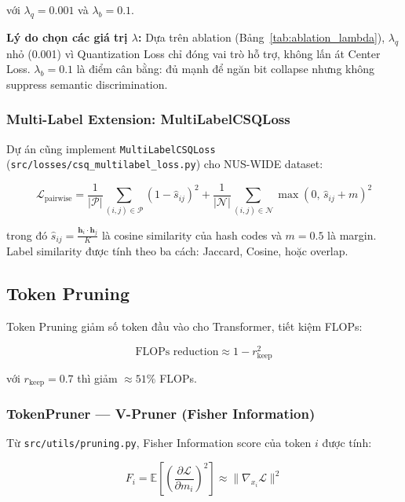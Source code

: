 \documentclass[13pt,a4paper]{article}
\begin{document}
với $\lambda_q = 0.001$ và $\lambda_b = 0.1$.

\textbf{Lý do chọn các giá trị $\lambda$:} Dựa trên ablation (Bảng~\ref{tab:ablation_lambda}), $\lambda_q$ nhỏ (0.001) vì Quantization Loss chỉ đóng vai trò hỗ trợ, không lấn át Center Loss. $\lambda_b = 0.1$ là điểm cân bằng: đủ mạnh để ngăn bit collapse nhưng không suppress semantic discrimination.

\subsubsection{Multi-Label Extension: MultiLabelCSQLoss}

Dự án cũng implement \texttt{MultiLabelCSQLoss} (\texttt{src/losses/csq\_multilabel\_loss.py}) cho NUS-WIDE dataset:

\begin{equation}
\mathcal{L}_{\text{pairwise}} = \frac{1}{|\mathcal{P}|}\sum_{(i,j)\in\mathcal{P}}(1-\hat{s}_{ij})^2 + \frac{1}{|\mathcal{N}|}\sum_{(i,j)\in\mathcal{N}}\max(0,\,\hat{s}_{ij}+m)^2
\end{equation}

trong đó $\hat{s}_{ij} = \frac{\mathbf{h}_i\cdot\mathbf{h}_j}{K}$ là cosine similarity của hash codes và $m=0.5$ là margin. Label similarity được tính theo ba cách: Jaccard, Cosine, hoặc overlap.


\subsection{Token Pruning}

Token Pruning giảm số token đầu vào cho Transformer, tiết kiệm FLOPs:

\begin{equation}
\text{FLOPs reduction} \approx 1 - r_{\text{keep}}^2
\end{equation}

với $r_{\text{keep}} = 0.7$ thì giảm $\approx 51\%$ FLOPs.

\subsubsection{TokenPruner --- V-Pruner (Fisher Information)}

Từ \texttt{src/utils/pruning.py}, Fisher Information score của token $i$ được tính:

\begin{equation}
F_i = \mathbb{E}\left[\left(\frac{\partial \mathcal{L}}{\partial m_i}\right)^2\right] \approx \|\nabla_{x_i} \mathcal{L}\|^2
\end{equation}
\end{document}
